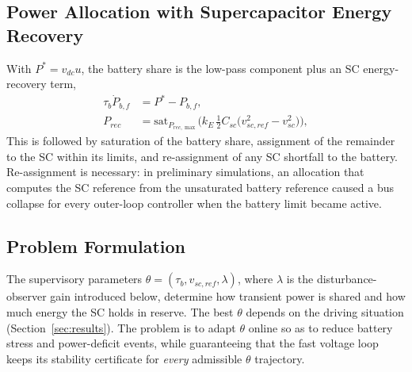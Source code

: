 \subsection{Power Allocation with Supercapacitor Energy Recovery}
With $P^*=v_{dc}u$, the battery share is the low-pass component plus an SC energy-recovery term,
\begin{align}
\tau_b\dot P_{b,f} &= P^*-P_{b,f},\label{eq:lpf}\\
P_{rec} &= \mathrm{sat}_{P_{rec,\max}}\!\Big(k_E\,\tfrac{1}{2}C_{sc}\big(v_{sc,ref}^2-v_{sc}^2\big)\Big),\label{eq:prec}
\end{align}
This is followed by saturation of the battery share, assignment of the remainder to the SC within its limits, and re-assignment of any SC shortfall to the battery. Re-assignment is necessary: in preliminary simulations, an allocation that computes the SC reference from the unsaturated battery reference caused a bus collapse for every outer-loop controller when the battery limit became active.

\subsection{Problem Formulation}
The supervisory parameters $\theta=(\tau_b, v_{sc,ref}, \lambda)$, where $\lambda$ is the disturbance-observer gain introduced below, determine how transient power is shared and how much energy the SC holds in reserve. The best $\theta$ depends on the driving situation (Section~\ref{sec:results}). The problem is to adapt $\theta$ online so as to reduce battery stress and power-deficit events, while guaranteeing that the fast voltage loop keeps its stability certificate for \emph{every} admissible $\theta$ trajectory.
